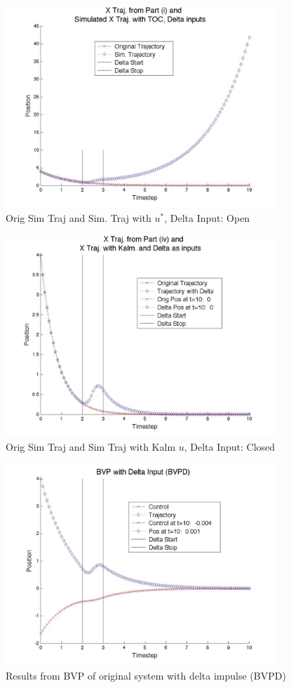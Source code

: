 \documentclass[12pt, notitlepage, letterpaper]{article}
\begin{document}
\begin{figure}[h]
\begin{center}
\includegraphics[width=4in]{OpenTrajsDel0to10}
\caption{\label{fig:deltaopen} Orig Sim Traj and Sim. Traj with $u^*$, Delta Input:  Open}
\end{center}
\end{figure}

\begin{figure}[h]
\begin{center}
\includegraphics[width=4in]{ClosedTrajsDel0to10}
\caption{\label{fig:deltaclosed} Orig Sim Traj and Sim Traj with Kalm $u$, Delta Input:  Closed}
\end{center}
\end{figure}

\begin{figure}[h]
\begin{center}
\includegraphics[width=4in]{OpenBVPDel}
\caption{\label{fig:OpenBVPDel} Results from BVP of original system with delta impulse (BVPD)}
\end{center}
\end{figure}
\end{document}
